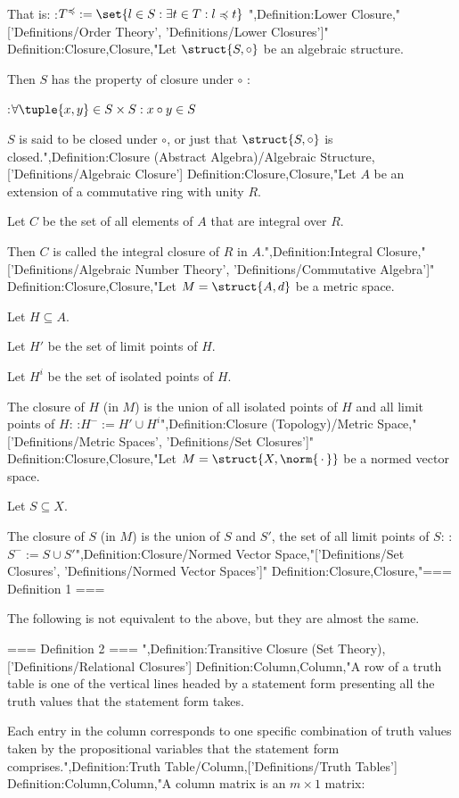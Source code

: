 That is:
:$T^\preccurlyeq := \set {l \in S: \exists t \in T: l \preccurlyeq t}$
",Definition:Lower Closure,"['Definitions/Order Theory', 'Definitions/Lower Closures']"
Definition:Closure,Closure,"Let $\struct {S, \circ}$ be an algebraic structure.


Then $S$ has the property of closure under $\circ$ :

:$\forall \tuple {x, y} \in S \times S: x \circ y \in S$


$S$ is said to be closed under $\circ$, or just that $\struct {S, \circ}$ is closed.",Definition:Closure (Abstract Algebra)/Algebraic Structure,['Definitions/Algebraic Closure']
Definition:Closure,Closure,"Let $A$ be an extension of a commutative ring with unity $R$.


Let $C$ be the set of all elements of $A$ that are integral over $R$.

Then $C$ is called the integral closure of $R$ in $A$.",Definition:Integral Closure,"['Definitions/Algebraic Number Theory', 'Definitions/Commutative Algebra']"
Definition:Closure,Closure,"Let $M = \struct {A, d}$ be a metric space.

Let $H \subseteq A$.

Let $H'$ be the set of limit points of $H$.

Let $H^i$ be the set of isolated points of $H$.


The closure of $H$ (in $M$) is the union of all isolated points of $H$ and all limit points of $H$:
:$H^- := H' \cup H^i$",Definition:Closure (Topology)/Metric Space,"['Definitions/Metric Spaces', 'Definitions/Set Closures']"
Definition:Closure,Closure,"Let $M = \struct {X, \norm {\, \cdot \,} }$ be a normed vector space.

Let $S \subseteq X$.


The closure of $S$ (in $M$) is the union of $S$ and $S'$, the set of all limit points of $S$:
:$S^- := S \cup S'$",Definition:Closure/Normed Vector Space,"['Definitions/Set Closures', 'Definitions/Normed Vector Spaces']"
Definition:Closure,Closure,"=== Definition 1 ===


The following is not equivalent to the above, but they are almost the same.

=== Definition 2 ===
",Definition:Transitive Closure (Set Theory),['Definitions/Relational Closures']
Definition:Column,Column,"A row of a truth table is one of the vertical lines headed by a statement form presenting all the truth values that the statement form takes.

Each entry in the column corresponds to one specific combination of truth values taken by the propositional variables that the statement form comprises.",Definition:Truth Table/Column,['Definitions/Truth Tables']
Definition:Column,Column,"A column matrix is an $m \times 1$ matrix:

